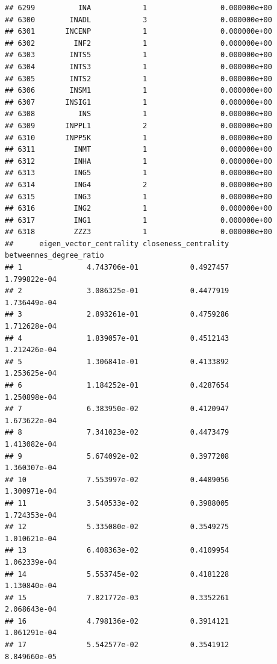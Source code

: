 \documentclass[
]{article}
\begin{document}
\begin{verbatim}
## 6299          INA            1                 0.000000e+00
## 6300        INADL            3                 0.000000e+00
## 6301       INCENP            1                 0.000000e+00
## 6302         INF2            1                 0.000000e+00
## 6303        INTS5            1                 0.000000e+00
## 6304        INTS3            1                 0.000000e+00
## 6305        INTS2            1                 0.000000e+00
## 6306        INSM1            1                 0.000000e+00
## 6307       INSIG1            1                 0.000000e+00
## 6308          INS            1                 0.000000e+00
## 6309       INPPL1            2                 0.000000e+00
## 6310       INPP5K            1                 0.000000e+00
## 6311         INMT            1                 0.000000e+00
## 6312         INHA            1                 0.000000e+00
## 6313         ING5            1                 0.000000e+00
## 6314         ING4            2                 0.000000e+00
## 6315         ING3            1                 0.000000e+00
## 6316         ING2            1                 0.000000e+00
## 6317         ING1            1                 0.000000e+00
## 6318         ZZZ3            1                 0.000000e+00
##      eigen_vector_centrality closeness_centrality betweennes_degree_ratio
## 1               4.743706e-01            0.4927457            1.799822e-04
## 2               3.086325e-01            0.4477919            1.736449e-04
## 3               2.893261e-01            0.4759286            1.712628e-04
## 4               1.839057e-01            0.4512143            1.212426e-04
## 5               1.306841e-01            0.4133892            1.253625e-04
## 6               1.184252e-01            0.4287654            1.250898e-04
## 7               6.383950e-02            0.4120947            1.673622e-04
## 8               7.341023e-02            0.4473479            1.413082e-04
## 9               5.674092e-02            0.3977208            1.360307e-04
## 10              7.553997e-02            0.4489056            1.300971e-04
## 11              3.540533e-02            0.3988005            1.724353e-04
## 12              5.335080e-02            0.3549275            1.010621e-04
## 13              6.408363e-02            0.4109954            1.062339e-04
## 14              5.553745e-02            0.4181228            1.130840e-04
## 15              7.821772e-03            0.3352261            2.068643e-04
## 16              4.798136e-02            0.3914121            1.061291e-04
## 17              5.542577e-02            0.3541912            8.849660e-05

\end{verbatim}
\end{document}

